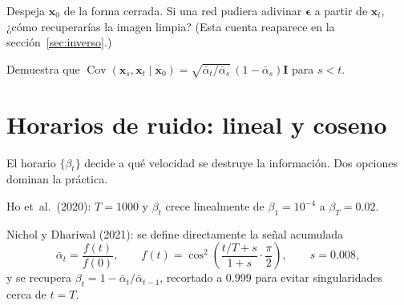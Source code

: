 \documentclass[11pt,letterpaper,oneside]{report}
\newcommand{\xb}{\mathbf{x}}
\newcommand{\eb}{\boldsymbol{\epsilon}}
\newcommand{\Ib}{\mathbf{I}}
\newcommand{\ab}{\bar{\alpha}}
\begin{document}
\begin{ejercicio}
Despeja $\xb_0$ de la forma cerrada. Si una red pudiera adivinar $\eb$ a partir de $\xb_t$, ¿cómo recuperarías la imagen limpia? (Esta cuenta reaparece en la sección~\ref{sec:inverso}.)
\end{ejercicio}

\begin{ejercicio}
Demuestra que $\operatorname{Cov}(\xb_s,\xb_t\mid\xb_0)=\sqrt{\ab_t/\ab_s}\,(1-\ab_s)\Ib$ para $s<t$.
\end{ejercicio}

\section{Horarios de ruido: lineal y coseno}\label{sec:horarios}

El horario $\{\beta_t\}$ decide a qué velocidad se destruye la información. Dos opciones dominan la práctica.

\begin{definicion}
Ho et~al.\ (2020): $T=1000$ y $\beta_t$ crece linealmente de $\beta_1=10^{-4}$ a $\beta_T=0.02$.
\end{definicion}

\begin{definicion}
Nichol y Dhariwal (2021): se define directamente la señal acumulada
\[
\ab_t=\frac{f(t)}{f(0)},\qquad f(t)=\cos^2\!\left(\frac{t/T+s}{1+s}\cdot\frac{\pi}{2}\right),\qquad s=0.008,
\]
y se recupera $\beta_t=1-\ab_t/\ab_{t-1}$, recortado a $0.999$ para evitar singularidades cerca de $t=T$.
\end{definicion}
\end{document}

